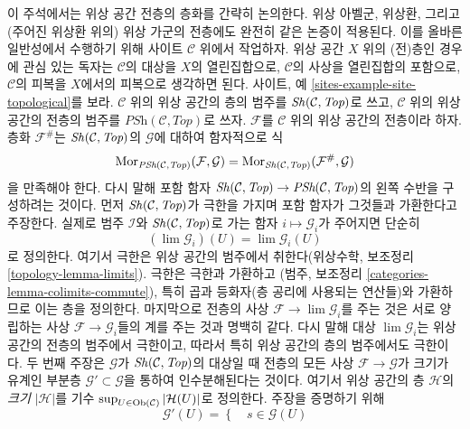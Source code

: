\begin{remark}[위상 공간 전층의 층화]
\label{remark-sheafification-of-presheaves-in-top}
\begin{reference}
\cite{Gray}
\end{reference}
이 주석에서는 위상 공간 전층의 층화를 간략히 논의한다.
위상 아벨군, 위상환, 그리고 (주어진 위상환 위의) 위상 가군의
전층에도 완전히 같은 논증이 적용된다. 이를 올바른 일반성에서
수행하기 위해 사이트 $\mathcal{C}$ 위에서 작업하자.
위상 공간 $X$ 위의 (전)층인 경우에 관심 있는 독자는
$\mathcal{C}$의 대상을 $X$의 열린집합으로, $\mathcal{C}$의 사상을
열린집합의 포함으로, $\mathcal{C}$의 피복을 $X$에서의 피복으로
생각하면 된다. 사이트, 예
\ref{sites-example-site-topological}를 보라.
$\mathcal{C}$ 위의 위상 공간의 층의 범주를
$\mathop{\mathit{Sh}}\nolimits(\mathcal{C}, \textit{Top})$로 쓰고, $\mathcal{C}$ 위의
위상 공간의 전층의 범주를
$\textit{PSh}(\mathcal{C}, \textit{Top})$로 쓰자.
$\mathcal{F}$를 $\mathcal{C}$ 위의 위상 공간의 전층이라 하자.
층화 $\mathcal{F}^\#$는 $\mathop{\mathit{Sh}}\nolimits(\mathcal{C}, \textit{Top})$의
$\mathcal{G}$에 대하여 함자적으로 식
$$
\mathop{\mathrm{Mor}}\nolimits_{\textit{PSh}(\mathcal{C}, \textit{Top})}(\mathcal{F}, \mathcal{G})
=
\mathop{\mathrm{Mor}}\nolimits_{\mathop{\mathit{Sh}}\nolimits(\mathcal{C}, \textit{Top})}(\mathcal{F}^\#, \mathcal{G})
$$
을 만족해야 한다. 다시 말해 포함 함자
$\mathop{\mathit{Sh}}\nolimits(\mathcal{C}, \textit{Top}) \to \textit{PSh}(\mathcal{C}, \textit{Top})$의
왼쪽 수반을 구성하려는 것이다. 먼저
$\mathop{\mathit{Sh}}\nolimits(\mathcal{C}, \textit{Top})$가 극한을 가지며 포함 함자가
그것들과 가환한다고 주장한다. 실제로 범주 $\mathcal{I}$와
$\mathop{\mathit{Sh}}\nolimits(\mathcal{C}, \textit{Top})$로 가는 함자
$i \mapsto \mathcal{G}_i$가 주어지면 단순히
$$
(\lim \mathcal{G}_i)(U) = \lim \mathcal{G}_i(U)
$$
로 정의한다. 여기서 극한은 위상 공간의 범주에서 취한다(위상수학,
보조정리 \ref{topology-lemma-limits}). 극한은 극한과 가환하고
(범주, 보조정리 \ref{categories-lemma-colimits-commute}), 특히 곱과
등화자(층 공리에 사용되는 연산들)와 가환하므로 이는 층을 정의한다.
마지막으로 전층의 사상 $\mathcal{F} \to \lim \mathcal{G}_i$를
주는 것은 서로 양립하는 사상
$\mathcal{F} \to \mathcal{G}_i$들의 계를 주는 것과 명백히 같다.
다시 말해 대상 $\lim \mathcal{G}_i$는 위상 공간의 전층의 범주에서
극한이고, 따라서 특히 위상 공간의 층의 범주에서도 극한이다.
두 번째 주장은 $\mathcal{G}$가 $\mathop{\mathit{Sh}}\nolimits(\mathcal{C}, \textit{Top})$의
대상일 때 전층의 모든 사상 $\mathcal{F} \to \mathcal{G}$가
크기가 유계인 부분층 $\mathcal{G}' \subset \mathcal{G}$을 통하여
인수분해된다는 것이다. 여기서 위상 공간의 층 $\mathcal{H}$의
{\it 크기} $|\mathcal{H}|$를 기수
$\sup_{U \in \mathop{\mathrm{Ob}}\nolimits(\mathcal{C})} |\mathcal{H}(U)|$로 정의한다.
주장을 증명하기 위해
$$
\mathcal{G}'(U) =
\left\{
\quad
s \in \mathcal{G}(U)
$$
\end{remark}

